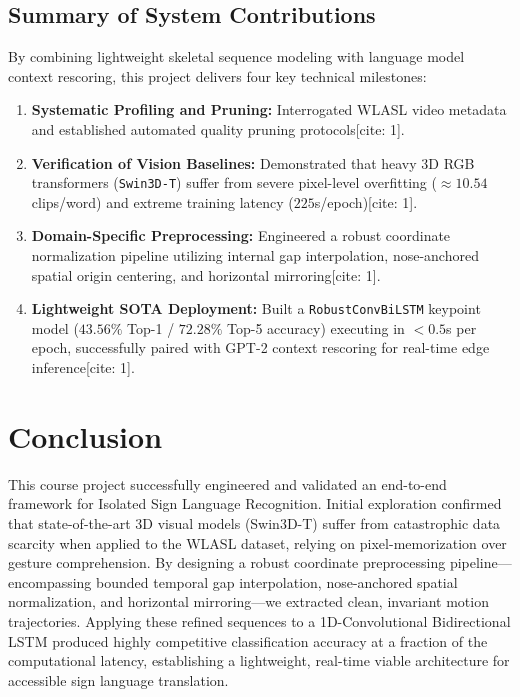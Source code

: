 \documentclass[12pt,a4paper]{article}
\begin{document}
\subsection{Summary of System Contributions}
By combining lightweight skeletal sequence modeling with language model context rescoring, this project delivers four key technical milestones:
\begin{enumerate}
    \item \textbf{Systematic Profiling and Pruning:} Interrogated WLASL video metadata and established automated quality pruning protocols[cite: 1].
    \item \textbf{Verification of Vision Baselines:} Demonstrated that heavy 3D RGB transformers (\texttt{Swin3D-T}) suffer from severe pixel-level overfitting ($\approx 10.54$ clips/word) and extreme training latency ($225$s/epoch)[cite: 1].
    \item \textbf{Domain-Specific Preprocessing:} Engineered a robust coordinate normalization pipeline utilizing internal gap interpolation, nose-anchored spatial origin centering, and horizontal mirroring[cite: 1].
    \item \textbf{Lightweight SOTA Deployment:} Built a \texttt{RobustConvBiLSTM} keypoint model ($43.56\%$ Top-1 / $72.28\%$ Top-5 accuracy) executing in $<0.5$s per epoch, successfully paired with GPT-2 context rescoring for real-time edge inference[cite: 1].
\end{enumerate}





\section{Conclusion}

This course project successfully engineered and validated an end-to-end framework for Isolated Sign Language Recognition. Initial exploration confirmed that state-of-the-art 3D visual models (Swin3D-T) suffer from catastrophic data scarcity when applied to the WLASL dataset, relying on pixel-memorization over gesture comprehension. By designing a robust coordinate preprocessing pipeline—encompassing bounded temporal gap interpolation, nose-anchored spatial normalization, and horizontal mirroring—we extracted clean, invariant motion trajectories. Applying these refined sequences to a 1D-Convolutional Bidirectional LSTM produced highly competitive classification accuracy at a fraction of the computational latency, establishing a lightweight, real-time viable architecture for accessible sign language translation.
\end{document}

